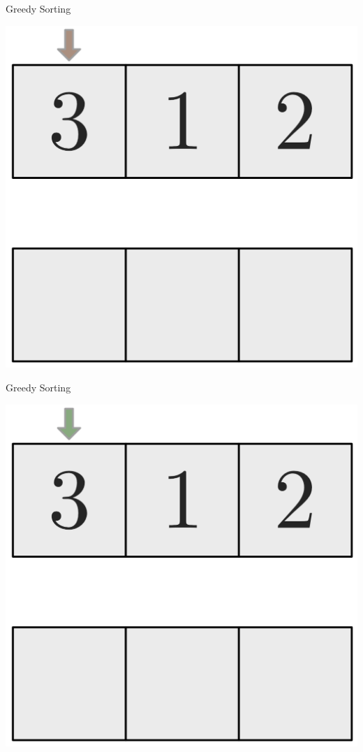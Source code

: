 \documentclass[10pt]{beamer}
\begin{document}
\begin{frame}[fragile]{Greedy Sorting}
    \begin{center}
        \includegraphics[height=.4\textheight]{Images/Bubblesort/Bubblesort_01}
    \end{center}
\end{frame}

\begin{frame}[fragile]{Greedy Sorting}
    \begin{center}
        \includegraphics[height=.4\textheight]{Images/Bubblesort/Bubblesort_02}
    \end{center}
\end{frame}
\end{document}
